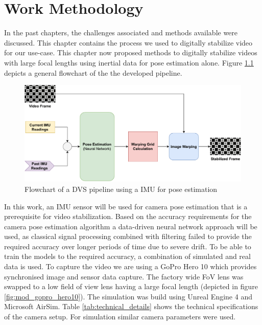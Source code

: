 \chapter{Work Methodology} \label{chapter_four}

In the past chapters, the challenges associated and methods available were discussed. This chapter contains the process we used to digitally stabilize video for our use-case. This chapter now proposed methods to digitally stabilize videos with large focal lengths using inertial data for pose estimation alone. Figure \ref{fig:dis_pipeline} depicts a general flowchart of the the developed pipeline.


\begin{figure}[H]
    \includegraphics[scale=0.58]{images/fig_chapter4/dis_pipleline.pdf}
    \caption{Flowchart of a DVS pipeline using a IMU for pose estimation}
    \label{fig:dis_pipeline}
\end{figure}

In this work, an IMU sensor will be used for camera pose estimation that is a prerequisite for video stabilization. Based on the accuracy requirements for the camera pose estimation algorithm a data-driven neural network approach will be used, as classical signal processing combined with filtering failed to provide the required accuracy over longer periods of time due to severe drift. To be able to train the models to the required accuracy, a combination of simulated and real data is used. To capture the video we are using a GoPro Hero 10 which provides synchronised image and sensor data capture. The factory wide FoV lens was swapped to a low field of view lens having a large focal length (depicted in figure \ref{fig:mod_gopro_hero10}). The simulation was build using Unreal Engine 4 and Microsoft AirSim. Table \ref{tab:technical_details} shows the technical specifications of the camera setup. For simulation similar camera parameters were used.

